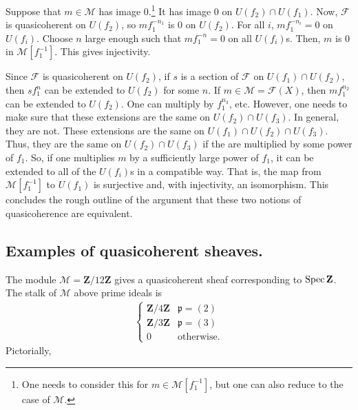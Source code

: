 \documentclass [11 pt, oneside] {article}
\begin{document}
Suppose that $m\in \mathscr{M}$ has image $0$.\footnote{One needs to consider this for $m\in \mathscr{M}[f_1^{-1}]$, but one can also reduce to the case of $\mathscr{M}$.} It has image $0$ on $U(f_2)\cap U(f_1)$. Now, $\mathscr{F}$ is quasicoherent on $U(f_2)$, so $mf_1^{-n_1}$ is $0$ on $U(f_2)$. For all $i$, $mf_1^{-n_i}=0$ on $U (f_i)$. Choose $n$ large enough such that $mf_1^{-n}=0$ on all $U(f_i)$s. Then, $m$ is $0$ in $\mathscr{M}[f_1^{-1}]$. This gives injectivity.

Since $\mathscr{F}$ is quasicoherent on $U(f_2)$, if $s$ is a section of $\mathscr{F}$ on $U(f_1) \cap U(f_2)$, then $sf_1^n$ can be extended to $U(f_2)$ for some $n$. If $m\in \mathscr{M}=\mathscr{F}(X)$, then $mf_1^{n_2}$ can be extended to $U(f_2)$. One can multiply by $f_1^{n_3}$, etc. However, one needs to make sure that these extensions are the same on $U(f_2)\cap U(f_3)$. In general, they are not. These extensions are the same on $U(f_1) \cap U(f_2) \cap U(f_3)$. Thus, they are the same on $U(f_2)\cap U(f_3)$ if the are multiplied by some power of $f_1$. So, if one multiplies $m$ by a sufficiently large power of $f_1$, it can be extended to all of the $U(f_i)$s in a compatible way. That is, the map from $\mathscr{M}[f_1^{-1}]$ to $U(f_1)$ is surjective and, with injectivity, an isomorphism. This concludes the rough outline of the argument that these two notions of quasicoherence are equivalent.

\subsection{Examples of quasicoherent sheaves.}
\begin{example}[ ]\label{}\text{}
The module $\mathscr{M} = \mathbf{Z}/12\mathbf{Z}$ gives a quasicoherent sheaf corresponding to $\operatorname{Spec} \mathbf{Z}$. The stalk of $\mathscr{M}$ above prime ideals is
\begin{align*}
	\begin{cases}
		\mathbf{Z}/4\mathbf{Z}&\mathfrak{p}=(2)\\
		\mathbf{Z}/3\mathbf{Z}& \mathfrak{p}=(3)\\
		0 &\textrm{otherwise.}
	\end{cases}
\end{align*}
Pictorially,
\begin{center}
\end{center}
\end{example}
\end{document}
